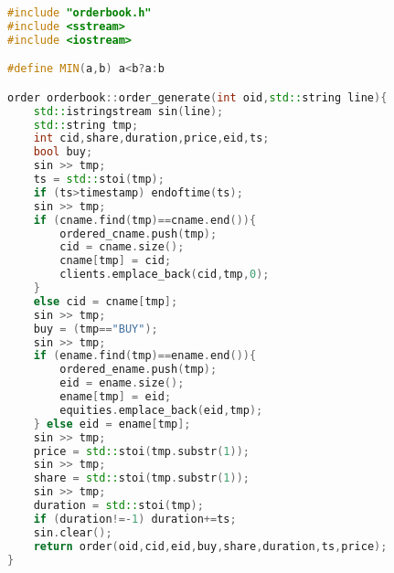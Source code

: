 \documentclass{article}
\begin{document}
\begin{lstlisting}[title=orderbook.cpp,language=C++]
#include "orderbook.h"
#include <sstream>
#include <iostream>

#define MIN(a,b) a<b?a:b

order orderbook::order_generate(int oid,std::string line){
    std::istringstream sin(line);
    std::string tmp;
    int cid,share,duration,price,eid,ts;
    bool buy;
    sin >> tmp;
    ts = std::stoi(tmp);
    if (ts>timestamp) endoftime(ts);
    sin >> tmp;
    if (cname.find(tmp)==cname.end()){
        ordered_cname.push(tmp);
        cid = cname.size();
        cname[tmp] = cid;
        clients.emplace_back(cid,tmp,0);
    }
    else cid = cname[tmp];
    sin >> tmp;
    buy = (tmp=="BUY");
    sin >> tmp;
    if (ename.find(tmp)==ename.end()){
        ordered_ename.push(tmp);
        eid = ename.size();
        ename[tmp] = eid;
        equities.emplace_back(eid,tmp);
    } else eid = ename[tmp];
    sin >> tmp;
    price = std::stoi(tmp.substr(1));
    sin >> tmp;
    share = std::stoi(tmp.substr(1));
    sin >> tmp;
    duration = std::stoi(tmp);
    if (duration!=-1) duration+=ts;
    sin.clear();
    return order(oid,cid,eid,buy,share,duration,ts,price); 
}


\end{lstlisting}
\end{document}
